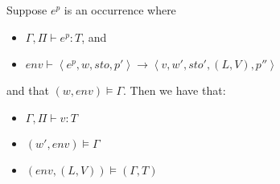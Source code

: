 \documentclass[../../master.tex]{subfiles}
\begin{document}
\begin{theorem}
	Suppose $e^p$ is an occurrence where
	\begin{itemize}
		\item $\Gamma,\Pi\vdash e^p : T$, and 
		\item $env\vdash\left\langle e^p,w,sto,p'\right\rangle\rightarrow\left\langle v,w',sto',(L,V),p''\right\rangle$
	\end{itemize}
	and that $(w,env)\models\Gamma$.
	Then we have that:
	\begin{itemize}
		\item $\Gamma,\Pi\vdash v : T$
		\item $(w',env)\models\Gamma$
		\item $(env,(L,V))\models (\Gamma,T)$
	\end{itemize}
\end{theorem}
\end{document}
